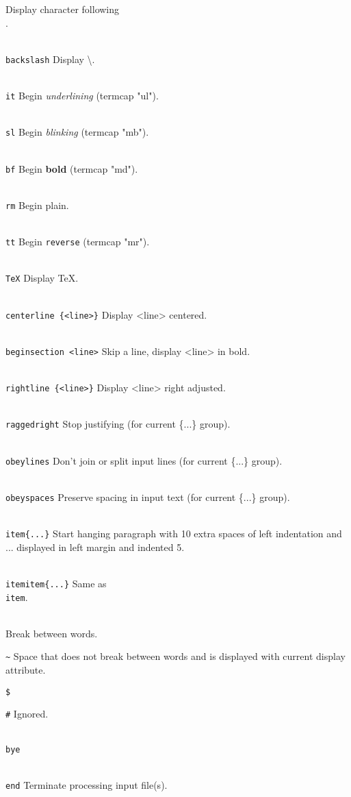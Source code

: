 			Display character following \\.
\item{\tt\\backslash}	Display \backslash.
\item{\tt \\it}		Begin {\it underlining} (termcap "ul").
\item{\tt \\sl}		Begin {\sl blinking} (termcap "mb").
\item{\tt \\bf}		Begin {\bf bold} (termcap "md").
\item{\tt \\rm}		Begin plain.
\item{\tt \\tt}		Begin {\tt reverse} (termcap "mr").
\item{\tt \\TeX}	Display \TeX.
\item{\tt \\centerline~\{<line>\}}
			Display <line> centered.
\item{\tt\\beginsection~<line>}
			Skip a line, display <line> in bold.
\item{\tt \\rightline~\{<line>\}}
			Display <line> right adjusted.
\item{\tt \\raggedright}
			Stop justifying (for current \{...\} group).
\item{\tt \\obeylines}	Don't join or split input lines
			(for current \{...\} group).
\item{\tt \\obeyspaces} Preserve spacing in input text
			(for current \{...\} group).
\item{\tt \\item\{...\}}
			Start hanging paragraph with 10 extra
			spaces of left indentation and ... displayed in
			left margin and indented 5.
\item{\tt \\itemitem\{...\}}
			Same as {\tt \\item}.
\item{\tt \\<space-character>}
			Break between words.
\item{\tt \~}		Space that does not break between words and
			is displayed with current display attribute.
\item{\tt \$}
\item{\tt \#}		Ignored.
\item{\tt \\bye}
\item{\tt \\end}	Terminate processing input file(s).

\bigskip
{}
\bye
